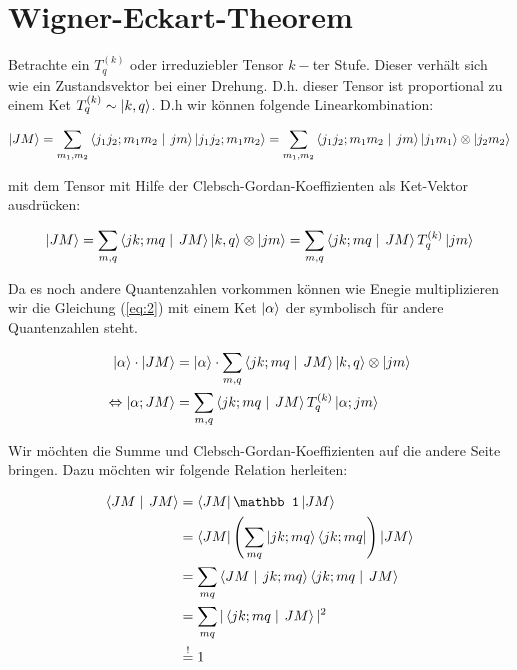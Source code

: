 
\usepackage{amsmath} 





\section*{Wigner-Eckart-Theorem}


Betrachte ein \(T^{(k)}_q\) oder irreduziebler Tensor \(k-\)ter Stufe. Dieser verhält sich wie ein Zustandsvektor bei einer Drehung. D.h. dieser Tensor ist proportional zu einem Ket \(T^{(k)}_q \sim \left| k,q \right\rangle \). D.h wir können folgende Linearkombination:



\begin{equation}
  \label{eq:1}
  \ket{JM} = \sum_{m_1,m_2}\braket{j_1j_2;m_1m_2}{jm}\ket{j_1j_2;m_1m_2} = \sum_{m_1,m_2}\braket{j_1j_2;m_1m_2}{jm}\ket{j_1m_1} \otimes \ket{j_2m_2}
\end{equation}

mit dem Tensor  mit Hilfe der Clebsch-Gordan-Koeffizienten als Ket-Vektor ausdrücken:



\begin{equation}
  \label{eq:2}
  \ket{JM} = \sum_{m,q} \braket{jk;mq}{JM} \ket{k,q}\otimes\ket{jm} =  \sum_{m,q} \braket{jk;mq}{JM} T^{(k)}_q  \ket{jm} 
\end{equation}


Da es noch andere Quantenzahlen vorkommen können wie Enegie multiplizieren wir die Gleichung (\ref{eq:2}) mit einem Ket \(\left| \alpha \right\rangle\) der symbolisch für andere Quantenzahlen steht.

\begin{align}
  \label{eq:3}
  \ket{\alpha}\cdot\ket{JM} &=  \ket{\alpha}\cdot\sum_{m,q} \braket{jk;mq}{JM} \ket{k,q}\otimes\ket{jm} \\
\Leftrightarrow \ket{\alpha; JM} &=  \sum_{m,q} \braket{jk;mq}{JM} T^{(k)}_q  \ket{\alpha;jm} 
\end{align}

Wir möchten die Summe und  Clebsch-Gordan-Koeffizienten auf die andere Seite bringen. Dazu möchten wir folgende Relation herleiten:

\begin{align}
  \label{eq:4}
 \braket{JM}{JM} &= \bra{JM} \mathbb 1 \ket{JM} \\
&= \bra{JM} \left( \sum_{mq}\ket{jk;mq}\bra{jk;mq}  \right) \ket{JM} \\
&=  \sum_{mq}\braket{JM}{jk;mq}\braket{jk;mq}{JM} \\
&=  \sum_{mq}|\braket{jk;mq}{JM} |^2\\
&\stackrel{!}= 1
\end{align}

